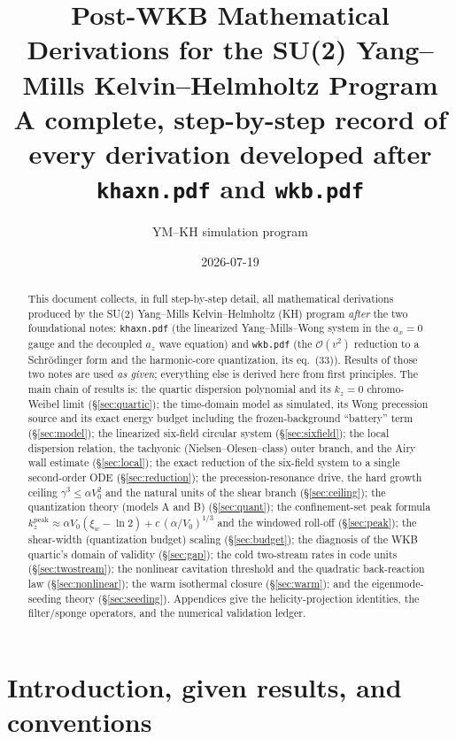 \documentclass[11pt,a4paper]{article}
\title{\textbf{Post-WKB Mathematical Derivations for the SU(2) Yang--Mills
Kelvin--Helmholtz Program}\\[1ex]
\large A complete, step-by-step record of every derivation developed after
\texttt{khaxn.pdf} and \texttt{wkb.pdf}}
\author{YM--KH simulation program}
\date{2026-07-19}
\numberwithin{equation}{section}
\theoremstyle{remark}
\newcommand{\Vo}{V_0}
\newcommand{\kz}{k_z}
\begin{document}
\maketitle

\begin{abstract}
\noindent
This document collects, in full step-by-step detail, all mathematical
derivations produced by the SU(2) Yang--Mills Kelvin--Helmholtz (KH) program
\emph{after} the two foundational notes: \texttt{khaxn.pdf} (the linearized
Yang--Mills--Wong system in the $a_x=0$ gauge and the decoupled $a_z$ wave
equation) and \texttt{wkb.pdf} (the $\mathcal{O}(v^2)$ reduction to a
Schr\"odinger form and the harmonic-core quantization, its eq.~(33)). Results
of those two notes are used \emph{as given}; everything else is derived here
from first principles. The main chain of results is: the quartic dispersion
polynomial and its $\kz=0$ chromo-Weibel limit (\S\ref{sec:quartic}); the
time-domain model as simulated, its Wong precession source and its exact
energy budget including the frozen-background ``battery'' term
(\S\ref{sec:model}); the linearized six-field circular system
(\S\ref{sec:sixfield}); the local dispersion relation, the tachyonic
(Nielsen--Olesen--class) outer branch, and the Airy wall estimate
(\S\ref{sec:local}); the exact reduction of the six-field system to a single
second-order ODE (\S\ref{sec:reduction}); the precession-resonance drive, the
hard growth ceiling $\gamma^3\le\alpha \Vo^2$ and the natural units of the
shear branch (\S\ref{sec:ceiling}); the quantization theory (models A and B)
(\S\ref{sec:quant}); the confinement-set peak formula
$\kz^{\mathrm{peak}}\approx \alpha \Vo(\xi_w-\ln 2)+c\,(\alpha/\Vo)^{1/3}$ and
the windowed roll-off (\S\ref{sec:peak}); the shear-width (quantization
budget) scaling (\S\ref{sec:budget}); the diagnosis of the WKB quartic's
domain of validity (\S\ref{sec:gap}); the cold two-stream rates in code units
(\S\ref{sec:twostream}); the nonlinear cavitation threshold and the
quadratic back-reaction law (\S\ref{sec:nonlinear}); the warm isothermal
closure (\S\ref{sec:warm}); and the eigenmode-seeding theory
(\S\ref{sec:seeding}). Appendices give the helicity-projection identities,
the filter/sponge operators, and the numerical validation ledger.
\end{abstract}

\tableofcontents
{\small\listoffigures}
\clearpage

\section{Introduction, given results, and conventions}
\label{sec:intro}
\end{document}
